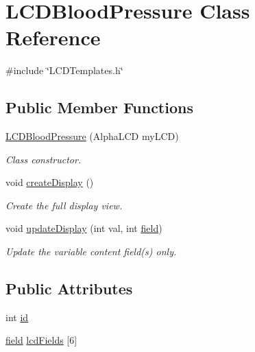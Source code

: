 \hypertarget{class_l_c_d_blood_pressure}{\section{L\-C\-D\-Blood\-Pressure Class Reference}
\label{class_l_c_d_blood_pressure}
}


{\ttfamily \#include \char`\"{}L\-C\-D\-Templates.\-h\char`\"{}}

\subsection*{Public Member Functions}
\begin{DoxyCompactItemize}
\item 
\hyperlink{class_l_c_d_blood_pressure_a61953d65527d1c62746746bd18398fd9}{L\-C\-D\-Blood\-Pressure} (Alpha\-L\-C\-D my\-L\-C\-D)
\begin{DoxyCompactList}\small\item\em Class constructor. \end{DoxyCompactList}\item 
void \hyperlink{class_l_c_d_blood_pressure_a59cea5aac4016136f02d5355e24a34fb}{create\-Display} ()
\begin{DoxyCompactList}\small\item\em Create the full display view. \end{DoxyCompactList}\item 
void \hyperlink{class_l_c_d_blood_pressure_ab04c92a0291696007acac275c52e6316}{update\-Display} (int val, int \hyperlink{_l_c_d_templates_8h_a20a49e010fbfc3a43959f12d92e01bb6}{field})
\begin{DoxyCompactList}\small\item\em Update the variable content field(s) only. \end{DoxyCompactList}\end{DoxyCompactItemize}
\subsection*{Public Attributes}
\begin{DoxyCompactItemize}
\item 
int \hyperlink{class_l_c_d_blood_pressure_a696aeab13e1360ccab183461537b5901}{id}
\item 
\hyperlink{_l_c_d_templates_8h_a20a49e010fbfc3a43959f12d92e01bb6}{field} \hyperlink{class_l_c_d_blood_pressure_a6e1365c0d4e86f192ce5b1daae22bb79}{lcd\-Fields} \mbox{[}6\mbox{]}
\end{DoxyCompactItemize}
